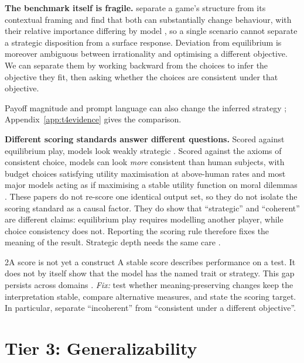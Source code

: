 \documentclass[11pt]{article}
\begin{document}
\textbf{The benchmark itself is fragile.} \citet{lore2024strategic}
separate a game's structure from its contextual framing and find that both can
substantially change behaviour, with their relative importance differing by
model \cite{tversky1981framing,robinson2025framing}, so a single scenario
cannot separate a strategic disposition from a surface response. Deviation from
equilibrium is moreover ambiguous between irrationality and optimising a
different objective. We can separate them by working backward from the choices
to infer the objective they fit, then asking whether the choices are consistent
under that objective.

Payoff magnitude and prompt language can also change the inferred strategy
\cite{huynh2026payoff}; Appendix~\ref{app:t4evidence} gives the comparison.

\textbf{Different scoring standards answer different questions.} Scored against
equilibrium play, models look weakly strategic
\cite{akata2025playing,duan2024gtbench}. Scored against the axioms of consistent
choice, models can look \emph{more} consistent than human subjects, with
budget choices satisfying utility maximisation at above-human rates and most
major models acting as if maximising a stable utility function on moral dilemmas
\cite{chen2023emergence,seror2024moralmind,tak2026sparks}. These papers do not
re-score one identical output set, so they do not isolate the scoring standard as a
causal factor. They do show that ``strategic'' and ``coherent'' are different
claims: equilibrium play requires modelling another player, while choice
consistency does not. Reporting the scoring rule therefore fixes the meaning of
the result. Strategic depth needs the same care
\cite{wen2025garp,gu2025revealed,mahajan2026mindgap,teo2026levelk,liu2025chbench}.

\begin{takeaway}{2}{A score is not yet a construct}
A stable score describes performance on a test. It does not by itself show that
the model has the named trait or strategy. This gap persists across domains
\cite{ye2025psychometrics,lin2025prompts,lin2026validity}. \emph{Fix:} test
whether meaning-preserving changes keep the interpretation stable, compare
alternative measures, and state the scoring target. In particular, separate
``incoherent'' from ``consistent under a different objective''.
\end{takeaway}

\section{Tier 3: Generalizability}
\label{sec:general}
\end{document}
